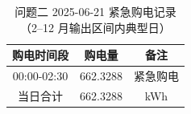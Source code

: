 \begin{table}[htbp]
\centering
\caption{问题二 2025-06-21 紧急购电记录（2--12 月输出区间内典型日）}\label{tab:q2-emergency}
\normalsize\setlength{\tabcolsep}{6pt}
\begin{tabular}{@{}ccc@{}}
\toprule
购电时间段 & 购电量 & 备注 \\
\midrule
00:00-02:30 & 662.3288 & 紧急购电 \\
\midrule
当日合计 & 662.3288 & kWh \\
\bottomrule
\end{tabular}
\end{table}

